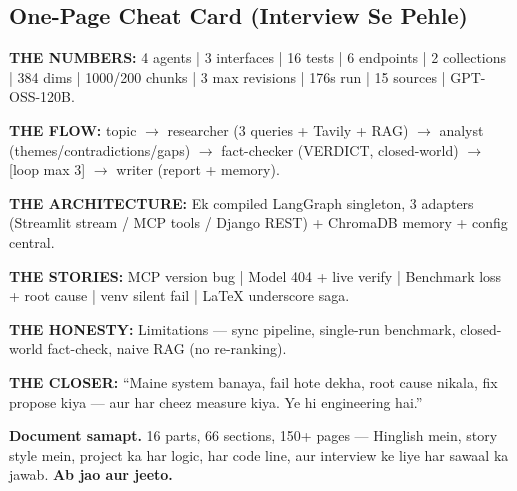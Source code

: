 \subsection{One-Page Cheat Card (Interview Se Pehle)}

\begin{designbox}
\textbf{THE NUMBERS:} 4 agents | 3 interfaces | 16 tests | 6 endpoints | 2 collections | 384 dims | 1000/200 chunks | 3 max revisions | 176s run | 15 sources | GPT-OSS-120B.

\textbf{THE FLOW:} topic $\rightarrow$ researcher (3 queries + Tavily + RAG) $\rightarrow$ analyst (themes/contradictions/gaps) $\rightarrow$ fact-checker (VERDICT, closed-world) $\rightarrow$ [loop max 3] $\rightarrow$ writer (report + memory).

\textbf{THE ARCHITECTURE:} Ek compiled LangGraph singleton, 3 adapters (Streamlit stream / MCP tools / Django REST) + ChromaDB memory + config central.

\textbf{THE STORIES:} MCP version bug | Model 404 + live verify | Benchmark loss + root cause | venv silent fail | LaTeX underscore saga.

\textbf{THE HONESTY:} Limitations --- sync pipeline, single-run benchmark, closed-world fact-check, naive RAG (no re-ranking).

\textbf{THE CLOSER:} ``Maine system banaya, fail hote dekha, root cause nikala, fix propose kiya --- aur har cheez measure kiya. Ye hi engineering hai.''
\end{designbox}

\begin{storybox}
\textbf{Document samapt.} 16 parts, 66 sections, 150+ pages --- Hinglish mein, story style mein, project ka har logic, har code line, aur interview ke liye har sawaal ka jawab. \textbf{Ab jao aur jeeto.} \faTrophy
\end{storybox}
